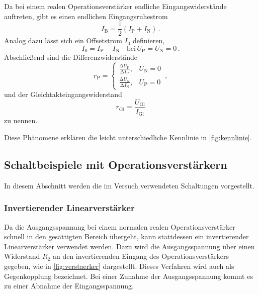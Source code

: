 Da bei einem realen Operationsverstärker endliche Eingangswiderstände auftreten, gibt es einen endlichen Eingangsruhestrom 
\begin{equation*}
    I_\text{B} = \frac{1}{2}\left( I_\text{P} + I_\text{N}\right)\, .
\end{equation*}
Analog dazu lässt sich ein Offsetstrom $I_0$ definieren, 
\begin{equation*}
    I_0 = I_\text{P} - I_\text{N}\quad \text{bei}\, U_\text{P} = U_\text{N}=0\, .
\end{equation*}
Abschließend sind die Differenzwiderstände
\begin{equation*}
    r_\text{P} = \begin{cases}
        \frac{\increment U_\text{P}}{\increment I_\text{P}} , & U_\text{N}=0\\
        \frac{\increment U_\text{N}}{\increment I_\text{N}} , & U_\text{P}=0
    \end{cases}\, ,
\end{equation*}
und der Gleichtakteingangswiderstand 
\begin{equation*}
    r_\text{Gl} = \frac{U_\text{Gl}}{I_\text{Gl}}
\end{equation*}
zu nennen.

Diese Phänomene erklären die leicht unterschiedliche Kennlinie in \autoref{fig:kennlinie}.

\subsection{Schaltbeispiele mit Operationsverstärkern}

\noindent 
In diesem Abschnitt werden die im Versuch verwendeten Schaltungen vorgestellt. 

\subsubsection{Invertierender Linearverstärker}

\noindent 
Da die Ausgangsspannung bei einem normalen realen Operationsverstärker schnell in den gesättigten Bereich übergeht, kann stattdessen ein invertierender Linearverstärker verwendet werden.
 Dazu wird die Ausgangsspannung über einen Widerstand $R_2$ an den invertierenden Eingang des Operationsverstärkers gegeben, wie in \autoref{fig:verstaerker} dargestellt. Dieses Verfahren wird auch als Gegenkopplung bezeichnet. Bei einer Zunahme der Ausgangsspannung kommt es zu einer Abnahme der Eingangsspannung. 

